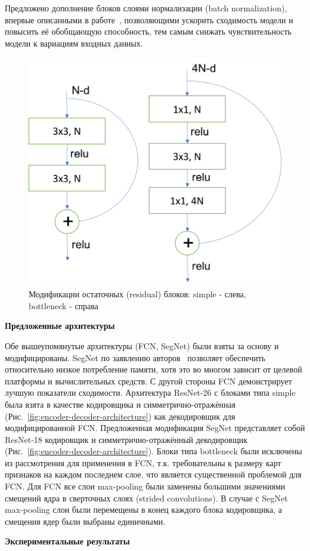 Предложено дополнение блоков слоями нормализации (batch normalization), впервые описанными в работе~\cite{ioffe_2015}, позволяющими ускорить сходимость модели и повысить её обобщающую способность, тем самым снижать чувствительность модели к вариациям входных данных.

\begin{figure}[t!]
	\centering
	\includegraphics[width=0.5\columnwidth]{pictures/res_types.png}
	\caption{Модификации остаточных (residual) блоков: simple - слева, bottleneck - справа}
	\label{fig:res-types}
\end{figure}

{\bf Предложенные архитектуры}
\label{sec:segm_proposed_architecture}

Обе вышеупомянутые архитектуры (FCN, SegNet) были взяты за основу и модифицированы. SegNet по заявлению авторов~\cite{badrinarayanan_2017} позволяет обеспечить относительно низкое потребление памяти, хотя это во многом зависит от целевой платформы и вычислительных средств. С другой стороны FCN демонстрирует лучшую показатели сходимости. Архитектура ResNet-26 с блоками типа simple была взята в качестве кодировщика и симметрично-отражённая (Рис.~\ref{fig:encoder-decoder-architecture}) как декодировщик для модифицированной FCN. Предложенная модификация SegNet представляет собой ResNet-18 кодировщик и симметрично-отражённый декодировщик (Рис.~\ref{fig:encoder-decoder-architecture}). Блоки типа bottleneck были исключены из рассмотрения для применения в FCN, т.к. требовательны к размеру карт признаков на каждом последнем слое, что является существенной проблемой для FCN. Для FCN все слои max-pooling были заменены большими значениями смещений ядра в сверточных слоях (strided convolutions). В случае с SegNet max-pooling слои были перемещены в конец каждого блока кодировщика, а смещения ядер были выбраны единичными.

{\bf Экспериментальные результаты}
\label{sec:segm_exp_results}


